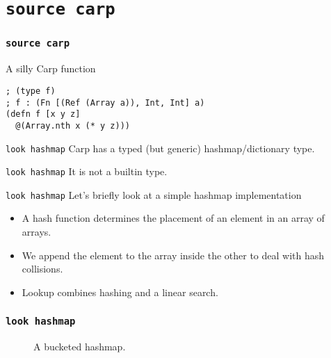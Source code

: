 \documentclass{beamer}
\begin{document}
  \section{\texttt{source carp}}
  \begin{frame}[fragile]
  \frametitle{\texttt{source carp}}
    \begin{listing}[H]
      \caption{A silly Carp function}
      \begin{verbatim}
; (type f)
; f : (Fn [(Ref (Array a)), Int, Int] a)
(defn f [x y z]
  @(Array.nth x (* y z)))
      \end{verbatim}
    \end{listing}
  \end{frame}
  \begin{frame}{\texttt{look hashmap}}
      Carp has a typed (but generic) hashmap/dictionary type.
  \end{frame}
  \begin{frame}{\texttt{look hashmap}}
      It is not a builtin type.
  \end{frame}
  \begin{frame}{\texttt{look hashmap}}
      Let’s briefly look at a simple hashmap implementation
      \begin{itemize}
        \item A hash function determines the placement of an element in an array of arrays.
        \item We append the element to the array inside the other to deal with hash collisions.
        \item Lookup combines hashing and a linear search.
      \end{itemize}
  \end{frame}
  \begin{frame}[fragile]
  \frametitle{\texttt{look hashmap}}
    \begin{figure}
      \caption{A bucketed hashmap.}
    \end{figure}
  \end{frame}
\end{document}
